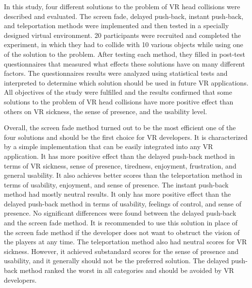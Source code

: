 In this study, four different solutions to the problem of VR head collisions were described and evaluated. The screen fade, delayed push-back, instant push-back, and teleportation methods were implemented and then tested in a specially designed virtual environment. 20 participants were recruited and completed the experiment, in which they had to collide with 10 various objects while using one of the solution to the problem. After testing each method, they filled in post-test questionnaires that measured what effects these solutions have on many different factors. The questionnaires results were analyzed using statistical tests and interpreted to determine which solution should be used in future VR applications. All objectives of the study were fulfilled and the results confirmed that some solutions to the problem of VR head collisions have more positive effect than others on VR sickness, the sense of presence, and the usability level.

Overall, the screen fade method turned out to be the most efficient one of the four solutions and should be the first choice for VR developers. It is characterized by a simple implementation that can be easily integrated into any VR application. It has more positive effect than the delayed push-back method in terms of VR sickness, sense of presence, tiredness, enjoyment, frustration, and general usability. It also achieves better scores than the teleportation method in terms of usability, enjoyment, and sense of presence. The instant push-back method had mostly neutral results. It only has more positive effect than the delayed push-back method in terms of usability, feelings of control, and sense of presence. No significant differences were found between the delayed push-back and the screen fade method. It is recommended to use this solution in place of the screen fade method if the developer does not want to obstruct the vision of the players at any time. The teleportation method also had neutral scores for VR sickness. However, it achieved substandard scores for the sense of presence and usability, and it generally should not be the preferred solution. The delayed push-back method ranked the worst in all categories and should be avoided by VR developers.

